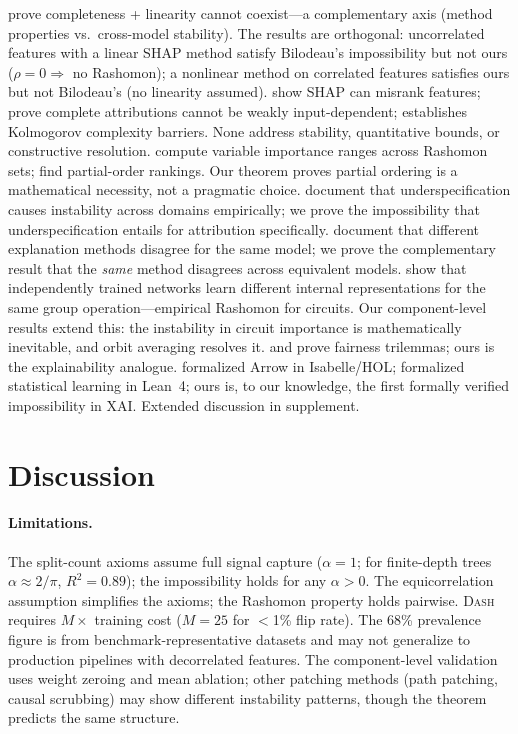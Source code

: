 \documentclass{article}
\newcommand{\DASH}{\textsc{Dash}}
\begin{document}
\citet{bilodeau2024impossibility} prove completeness + linearity cannot coexist---a complementary axis (method properties vs.\ cross-model stability). The results are orthogonal: uncorrelated features with a linear SHAP method satisfy Bilodeau's impossibility but not ours ($\rho = 0 \Rightarrow$ no Rashomon); a nonlinear method on correlated features satisfies ours but not Bilodeau's (no linearity assumed). \citet{huang2024failings} show SHAP can misrank features; \citet{srinivas2019full} prove complete attributions cannot be weakly input-dependent; \citet{rao2025limits} establishes Kolmogorov complexity barriers. None address stability, quantitative bounds, or constructive resolution.
\citet{fisher2019models} compute variable importance ranges across Rashomon sets; \citet{laberge2023partial} find partial-order rankings. Our theorem proves partial ordering is a mathematical necessity, not a pragmatic choice.
\citet{damour2022underspecification} document that underspecification causes instability across domains empirically; we prove the impossibility that underspecification entails for attribution specifically.
\citet{krishna2022disagreement} document that different explanation methods disagree for the same model; we prove the complementary result that the \emph{same} method disagrees across equivalent models.
\citet{chughtai2023toy} show that independently trained networks learn different internal representations for the same group operation---empirical Rashomon for circuits. Our component-level results extend this: the instability in circuit importance is mathematically inevitable, and orbit averaging resolves it.
\citet{chouldechova2017fair} and \citet{kleinberg2017inherent} prove fairness trilemmas; ours is the explainability analogue.
\citet{nipkow2009social} formalized Arrow in Isabelle/HOL; \citet{zhang2026statistical} formalized statistical learning in Lean~4; ours is, to our knowledge, the first formally verified impossibility in XAI. Extended discussion in supplement.

\section{Discussion}
\label{sec:discussion}

\paragraph{Limitations.}
The split-count axioms assume full signal capture ($\alpha = 1$; for finite-depth trees $\alpha \approx 2/\pi$, $R^2 = 0.89$); the impossibility holds for any $\alpha > 0$.
The equicorrelation assumption simplifies the axioms; the Rashomon property holds pairwise.
\DASH{} requires $M \times$ training cost ($M = 25$ for $<$1\% flip rate).
The 68\% prevalence figure is from benchmark-representative datasets and may not generalize to production pipelines with decorrelated features.
The component-level validation uses weight zeroing and mean ablation; other patching methods (path patching, causal scrubbing) may show different instability patterns, though the theorem predicts the same structure.
\end{document}
